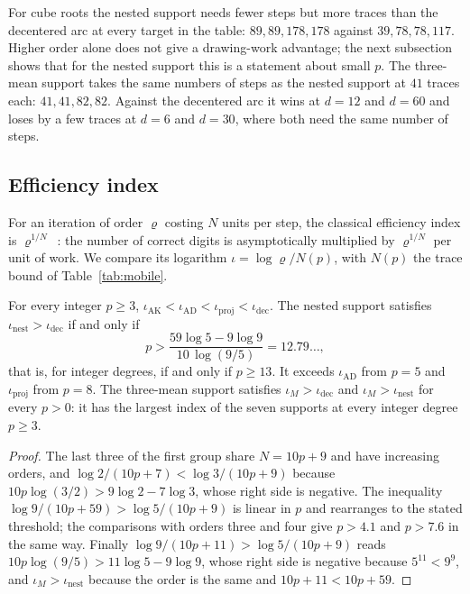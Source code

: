 For cube roots the nested support needs fewer steps but more traces than the decentered arc at every
target in the table: $89,89,178,178$ against $39,78,78,117$. Higher order alone does not give a
drawing-work advantage; the next subsection shows that for the nested support this is a statement about
small $p$. The three-mean support takes the same numbers of steps as the nested support at $41$ traces
each: $41,41,82,82$. Against the decentered arc it wins at $d=12$ and $d=60$ and loses by a few traces
at $d=6$ and $d=30$, where both need the same number of steps.

\subsection{Efficiency index}

For an iteration of order $\varrho$ costing $N$ units per step, the classical efficiency index is
$\varrho^{1/N}$~\cite{ostrowski,traub64}: the number of correct digits is asymptotically multiplied by
$\varrho^{1/N}$ per unit of work. We compare its logarithm $\iota=\log\varrho/N(p)$, with $N(p)$ the
trace bound of Table~\ref{tab:mobile}.

\begin{proposition}\label{prop:index}
For every integer $p\ge3$, $\iota_{\mathrm{AK}}<\iota_{\mathrm{AD}}<\iota_{\mathrm{proj}}<\iota_{\mathrm{dec}}$.
The nested support satisfies $\iota_{\mathrm{nest}}>\iota_{\mathrm{dec}}$ if and only if
\[ p>\frac{59\log5-9\log9}{10\,\log(9/5)}=12.79\ldots, \]
that is, for integer degrees, if and only if $p\ge13$. It exceeds $\iota_{\mathrm{AD}}$ from $p=5$ and
$\iota_{\mathrm{proj}}$ from $p=8$. The three-mean support satisfies
$\iota_{M}>\iota_{\mathrm{dec}}$ and $\iota_{M}>\iota_{\mathrm{nest}}$ for every $p>0$: it has the
largest index of the seven supports at every integer degree $p\ge3$.
\end{proposition}
\begin{proof}
The last three of the first group share $N=10p+9$ and have increasing orders, and
$\log2/(10p+7)<\log3/(10p+9)$ because $10p\log(3/2)>9\log2-7\log3$, whose right side is negative. The
inequality $\log9/(10p+59)>\log5/(10p+9)$ is linear in $p$ and rearranges to the stated threshold; the
comparisons with orders three and four give $p>4.1$ and $p>7.6$ in the same way. Finally
$\log9/(10p+11)>\log5/(10p+9)$ reads $10p\log(9/5)>11\log5-9\log9$, whose right side is negative
because $5^{11}<9^{9}$, and $\iota_M>\iota_{\mathrm{nest}}$ because the order is the same and
$10p+11<10p+59$.
\end{proof}

